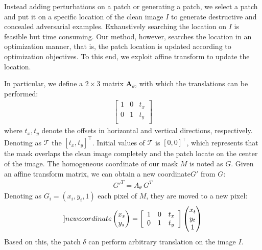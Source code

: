 \documentclass[10pt,twocolumn,letterpaper]{article}
\begin{document}
Instead adding perturbations on a patch
or generating a patch, we select a patch and put it on a specific
location of the clean 
image $I$ to generate destructive and concealed adversarial examples. 
Exhaustively searching the location on $I$ is feasible but time 
consuming. 
Our method, however, searches the location in an optimization manner, 
that is, the patch location is updated according to 
optimization objectives.
To this end, we exploit affine transform to update the location.

In particular, we define a $2 \times 3$ matrix 
$\mathbf{A}_\theta$, with which the translations can be performed: 
\begin{align}
	\left[
		\begin{array}{ccc}
			1 & 0 & t_x \\
			0 & 1 & t_y \\
		\end{array}
		\right]      
\end{align}
where $t_x, t_y$ denote the offsets in 
horizontal and vertical directions, respectively. 
Denoting as $\mathcal{T}$ the $[t_x,t_y]^\top$.
Initial values of $\mathcal{T}$ is $[0,0]^\top$, 
which represents that the mask overlaps the 
clean image completely and the patch
locate on the center of the image.
The homogeneous coordinate of our mask $M$ is noted as $G$.
Given an affine transform matrix, we can obtain a new 
coordinate$G'$ from $G$:
\begin{align}
	{G'}^T = A_{\theta}~{G}^T
\end{align}
Denoting as $G_i = (x_i, y_i, 1)$ each pixel of $M$,
they are moved to a new pixel:
\begin{align}
	\label[]{new coordinate}
\begin{pmatrix}
	x_s\\
	y_s	
	\end{pmatrix} = 
		\left[
			\begin{array}{ccc}
				1 & 0 & t_x \\
				0 & 1 & t_y \\
			\end{array}
			\right] 
			\begin{pmatrix}
				x_t\\
				y_t\\
				1	
				\end{pmatrix} 
\end{align}
Based on this, the patch $\delta$ can perform 
arbitrary translation on the image $I$.

\end{document}
